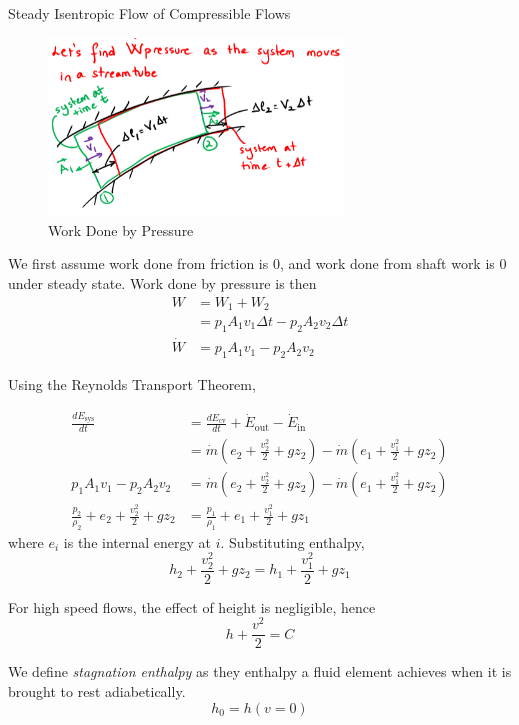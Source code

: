 \documentclass[12pt]{article}
\begin{document}
\begin{ex}
	Steady Isentropic Flow of Compressible Flows

	\begin{figure}
		\includegraphics[width=0.7\textwidth]{stream.png}
		\caption{Work Done by Pressure}
	\end{figure}

	We first assume work done from friction is 0, and work done from shaft work is 0 under steady state. Work done by pressure is then
	\begin{align*}
		W &= W_1 + W_2 \\
		  &= p_1A_1v_1\Delta t - p_2A_2v_2\Delta t \\
		\dot{W} &= p_1A_1v_1 - p_2A_2v_2
	\end{align*}

	Using the Reynolds Transport Theorem,

	\begin{align*}
		\frac{dE_\mathrm{sys}}{dt} &= \frac{dE_\mathrm{cv}}{dt} + \dot{E}_\mathrm{out} - \dot{E}_\mathrm{in} \\
					   &= \dot{m}(e_2 + \frac{v_2^2}{2} + gz_2) - \dot{m}(e_1 + \frac{v_1^2}{2} + gz_2) \\
		p_1A_1v_1 - p_2A_2v_2 &= \dot{m}(e_2 + \frac{v_2^2}{2} + gz_2) - \dot{m}(e_1 + \frac{v_1^2}{2} + gz_2) \\
		\frac{p_2}{\rho_2} + e_2 + \frac{v_2^2}{2} + gz_2 &= \frac{p_1}{\rho_1} + e_1 + \frac{v_1^2}{2} + gz_1
	\end{align*}
	where $e_i$ is the internal energy at $i$. Substituting enthalpy,
	$$h_2 + \frac{v_2^2}{2} + gz_2 = h_1 + \frac{v_1^2}{2} + gz_1$$
\end{ex}

For high speed flows, the effect of height is negligible, hence
\begin{equation}\label{enth}
	h + \frac{v^2}{2} = C
\end{equation}

\begin{defn}
	We define \emph{stagnation enthalpy} as they enthalpy a fluid element achieves when it is brought to rest adiabetically.
	$$h_0 = h(v=0)$$
\end{defn}
\end{document}
